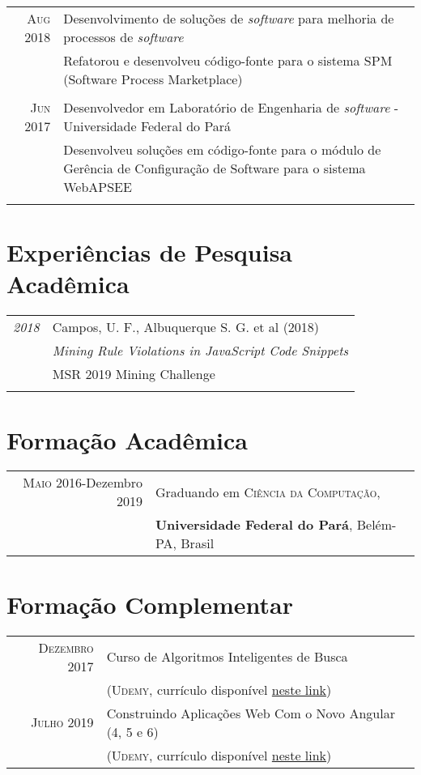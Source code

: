 \documentclass[a4paper,10pt]{article}
\begin{document}
\begin{tabular}{r|p{11cm}}
 \textsc{Aug 2018} & Desenvolvimento de soluções de \textit{software} para melhoria de processos de \textit{software}\\& \footnotesize{Refatorou e desenvolveu código-fonte para o sistema SPM (Software Process Marketplace)}\\\\
 \textsc{Jun 2017} & Desenvolvedor em Laboratório de Engenharia de \textit{software} - Universidade Federal do Pará \\ & \footnotesize{Desenvolveu soluções em código-fonte para o módulo de Gerência de Configuração de Software para o sistema WebAPSEE}\\\multicolumn{2}{c}{} \\
\end{tabular}

\section{Experiências de Pesquisa Acadêmica}
\begin{tabular}{r|p{11cm}}
 \emph{2018} & Campos, U. F., Albuquerque S. G. et al (2018)\\
 & \textit{Mining Rule Violations in JavaScript Code Snippets}\\
 & MSR 2019 Mining Challenge\\\multicolumn{2}{c}{} \\
\end{tabular}

\section{Formação Acadêmica}
\begin{tabular}{rl}	
 \textsc{Maio} 2016-Dezembro 2019 & Graduando em \textsc{Ciência da Computação}, \\
& \textbf{Universidade Federal do Pará}, Belém-PA, Brasil
\end{tabular}

\section{Formação Complementar}
\begin{tabular}{rl}
\textsc{Dezembro} 2017 & Curso de Algoritmos Inteligentes de Busca\\ & (\textsc{Udemy}, \footnotesize{currículo disponível \href{https://www.udemy.com/certificate/UC-9414I0UR/}{neste link}})\\
\textsc{Julho} 2019 &  Construindo Aplicações Web Com o Novo Angular (4, 5 e 6)\\ & (\textsc{Udemy}, \footnotesize{currículo disponível \href{https://www.udemy.com/certificate/UC-P6VGWTET/}{neste link}})
\end{tabular}
\end{document}
